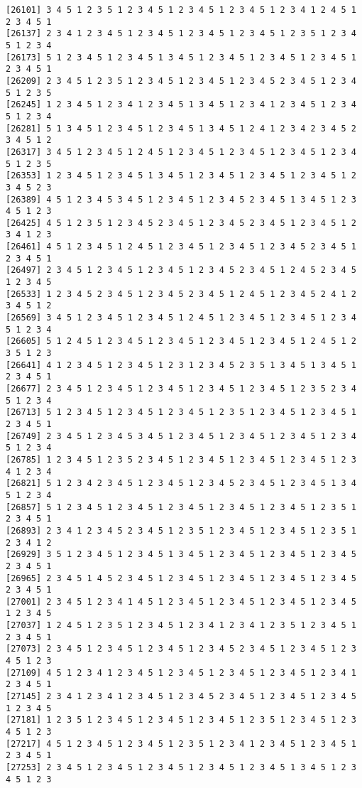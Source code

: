 \documentclass[
  11pt,
]{book}
\begin{document}
\begin{verbatim}
[26101] 3 4 5 1 2 3 5 1 2 3 4 5 1 2 3 4 5 1 2 3 4 5 1 2 3 4 1 2 4 5 1 2 3 4 5 1
[26137] 2 3 4 1 2 3 4 5 1 2 3 4 5 1 2 3 4 5 1 2 3 4 5 1 2 3 5 1 2 3 4 5 1 2 3 4
[26173] 5 1 2 3 4 5 1 2 3 4 5 1 3 4 5 1 2 3 4 5 1 2 3 4 5 1 2 3 4 5 1 2 3 4 5 1
[26209] 2 3 4 5 1 2 3 5 1 2 3 4 5 1 2 3 4 5 1 2 3 4 5 2 3 4 5 1 2 3 4 5 1 2 3 5
[26245] 1 2 3 4 5 1 2 3 4 1 2 3 4 5 1 3 4 5 1 2 3 4 1 2 3 4 5 1 2 3 4 5 1 2 3 4
[26281] 5 1 3 4 5 1 2 3 4 5 1 2 3 4 5 1 3 4 5 1 2 4 1 2 3 4 2 3 4 5 2 3 4 5 1 2
[26317] 3 4 5 1 2 3 4 5 1 2 4 5 1 2 3 4 5 1 2 3 4 5 1 2 3 4 5 1 2 3 4 5 1 2 3 5
[26353] 1 2 3 4 5 1 2 3 4 5 1 3 4 5 1 2 3 4 5 1 2 3 4 5 1 2 3 4 5 1 2 3 4 5 2 3
[26389] 4 5 1 2 3 4 5 3 4 5 1 2 3 4 5 1 2 3 4 5 2 3 4 5 1 3 4 5 1 2 3 4 5 1 2 3
[26425] 4 5 1 2 3 5 1 2 3 4 5 2 3 4 5 1 2 3 4 5 2 3 4 5 1 2 3 4 5 1 2 3 4 1 2 3
[26461] 4 5 1 2 3 4 5 1 2 4 5 1 2 3 4 5 1 2 3 4 5 1 2 3 4 5 2 3 4 5 1 2 3 4 5 1
[26497] 2 3 4 5 1 2 3 4 5 1 2 3 4 5 1 2 3 4 5 2 3 4 5 1 2 4 5 2 3 4 5 1 2 3 4 5
[26533] 1 2 3 4 5 2 3 4 5 1 2 3 4 5 2 3 4 5 1 2 4 5 1 2 3 4 5 2 4 1 2 3 4 5 1 2
[26569] 3 4 5 1 2 3 4 5 1 2 3 4 5 1 2 4 5 1 2 3 4 5 1 2 3 4 5 1 2 3 4 5 1 2 3 4
[26605] 5 1 2 4 5 1 2 3 4 5 1 2 3 4 5 1 2 3 4 5 1 2 3 4 5 1 2 4 5 1 2 3 5 1 2 3
[26641] 4 1 2 3 4 5 1 2 3 4 5 1 2 3 1 2 3 4 5 2 3 5 1 3 4 5 1 3 4 5 1 2 3 4 5 1
[26677] 2 3 4 5 1 2 3 4 5 1 2 3 4 5 1 2 3 4 5 1 2 3 4 5 1 2 3 5 2 3 4 5 1 2 3 4
[26713] 5 1 2 3 4 5 1 2 3 4 5 1 2 3 4 5 1 2 3 5 1 2 3 4 5 1 2 3 4 5 1 2 3 4 5 1
[26749] 2 3 4 5 1 2 3 4 5 3 4 5 1 2 3 4 5 1 2 3 4 5 1 2 3 4 5 1 2 3 4 5 1 2 3 4
[26785] 1 2 3 4 5 1 2 3 5 2 3 4 5 1 2 3 4 5 1 2 3 4 5 1 2 3 4 5 1 2 3 4 1 2 3 4
[26821] 5 1 2 3 4 2 3 4 5 1 2 3 4 5 1 2 3 4 5 2 3 4 5 1 2 3 4 5 1 3 4 5 1 2 3 4
[26857] 5 1 2 3 4 5 1 2 3 4 5 1 2 3 4 5 1 2 3 4 5 1 2 3 4 5 1 2 3 5 1 2 3 4 5 1
[26893] 2 3 4 1 2 3 4 5 2 3 4 5 1 2 3 5 1 2 3 4 5 1 2 3 4 5 1 2 3 5 1 2 3 4 1 2
[26929] 3 5 1 2 3 4 5 1 2 3 4 5 1 3 4 5 1 2 3 4 5 1 2 3 4 5 1 2 3 4 5 2 3 4 5 1
[26965] 2 3 4 5 1 4 5 2 3 4 5 1 2 3 4 5 1 2 3 4 5 1 2 3 4 5 1 2 3 4 5 2 3 4 5 1
[27001] 2 3 4 5 1 2 3 4 1 4 5 1 2 3 4 5 1 2 3 4 5 1 2 3 4 5 1 2 3 4 5 1 2 3 4 5
[27037] 1 2 4 5 1 2 3 5 1 2 3 4 5 1 2 3 4 1 2 3 4 1 2 3 5 1 2 3 4 5 1 2 3 4 5 1
[27073] 2 3 4 5 1 2 3 4 5 1 2 3 4 5 1 2 3 4 5 2 3 4 5 1 2 3 4 5 1 2 3 4 5 1 2 3
[27109] 4 5 1 2 3 4 1 2 3 4 5 1 2 3 4 5 1 2 3 4 5 1 2 3 4 5 1 2 3 4 1 2 3 4 5 1
[27145] 2 3 4 1 2 3 4 1 2 3 4 5 1 2 3 4 5 2 3 4 5 1 2 3 4 5 1 2 3 4 5 1 2 3 4 5
[27181] 1 2 3 5 1 2 3 4 5 1 2 3 4 5 1 2 3 4 5 1 2 3 5 1 2 3 4 5 1 2 3 4 5 1 2 3
[27217] 4 5 1 2 3 4 5 1 2 3 4 5 1 2 3 5 1 2 3 4 1 2 3 4 5 1 2 3 4 5 1 2 3 4 5 1
[27253] 2 3 4 5 1 2 3 4 5 1 2 3 4 5 1 2 3 4 5 1 2 3 4 5 1 3 4 5 1 2 3 4 5 1 2 3

\end{verbatim}
\end{document}

